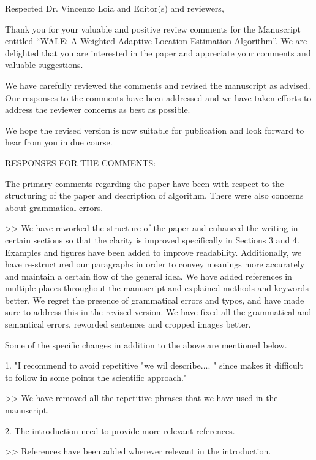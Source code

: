 Respected Dr. Vincenzo Loia and Editor(s) and reviewers, 

Thank you for your valuable and positive review comments for the Manuscript entitled “WALE: A Weighted Adaptive Location Estimation Algorithm”. We are delighted that you are interested in the paper and appreciate your comments and valuable suggestions. 

We have carefully reviewed the comments and revised the manuscript as advised. Our responses to the comments have been addressed  and we have taken efforts to address the reviewer concerns as best as possible. 

We hope the revised version is now suitable for publication and look forward to hear from you in due course.

RESPONSES FOR THE COMMENTS:

The primary comments regarding the paper have been with respect to the structuring of the paper and description of algorithm. There were also concerns about grammatical errors. 

>> We have reworked the structure of the paper and enhanced the writing in certain sections so that the clarity is improved specifically in Sections 3 and 4. Examples and figures have been added to improve readability. Additionally, we have re-structured our paragraphs in order to convey meanings more accurately and maintain a certain flow of the general idea. We have added references in multiple places throughout the manuscript and explained methods and keywords better.  We regret the presence of grammatical errors and typos, and have made sure to address this in the revised version. We have fixed all the grammatical and semantical errors, reworded sentences and cropped images better. 

Some of the specific changes in addition to the above are mentioned below.

1. "I recommend to avoid repetitive "we wil describe.... " since makes it difficult to follow in some points the scientific approach."

>> We have removed all the repetitive phrases that we have used in the manuscript. 

2. The introduction need to provide more relevant references.

>> References have been added wherever relevant in the introduction.


